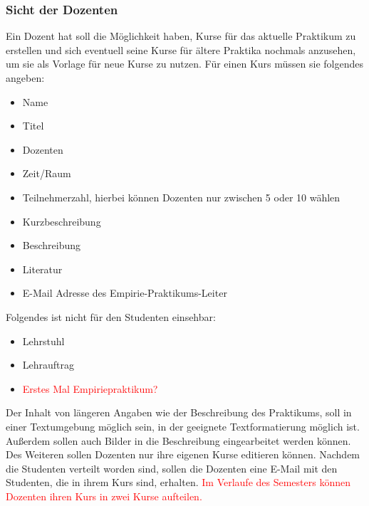             \subsubsection{Sicht der Dozenten}
                Ein Dozent hat soll die Möglichkeit haben, Kurse für das aktuelle Praktikum zu erstellen und sich eventuell seine Kurse für ältere Praktika nochmals anzusehen, um sie als Vorlage für neue Kurse zu nutzen. 
                Für einen Kurs müssen sie folgendes angeben:
                \begin{itemize}
                    \item Name
                    \item Titel
                    \item Dozenten
                    \item Zeit/Raum
                    \item Teilnehmerzahl, hierbei können Dozenten nur zwischen 5 oder 10 wählen
                    \item Kurzbeschreibung
                    \item Beschreibung
                    \item Literatur
                    \item E-Mail Adresse des Empirie-Praktikums-Leiter %
                \end{itemize}
                Folgendes ist nicht für den Studenten einsehbar:
                \begin{itemize}
                    \item Lehrstuhl
                    \item Lehrauftrag
                    \item \textcolor{red}{Erstes Mal Empiriepraktikum?}
                \end{itemize}
                Der Inhalt von längeren Angaben wie der Beschreibung des Praktikums, soll in einer Textumgebung möglich sein, in der geeignete Textformatierung möglich ist.
                Außerdem sollen auch Bilder in die Beschreibung eingearbeitet werden können.
                Des Weiteren sollen Dozenten nur ihre eigenen Kurse editieren können.
                Nachdem die Studenten verteilt worden sind, sollen die Dozenten eine E-Mail mit den Studenten, die in ihrem Kurs sind, erhalten.
                \textcolor{red}{Im Verlaufe des Semesters können Dozenten ihren Kurs in zwei Kurse aufteilen.}
    
